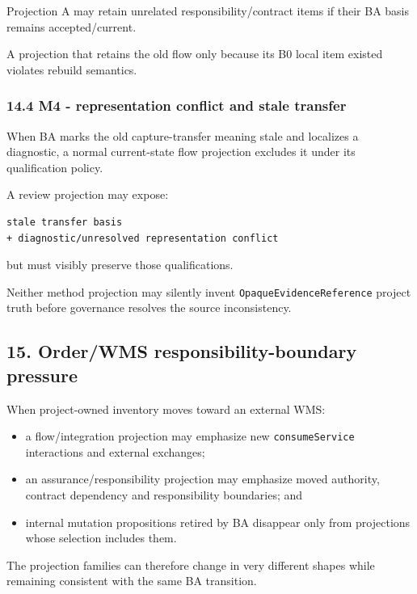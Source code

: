 \documentclass[11pt,a4paper]{article}
\providecommand{\tightlist}{\setlength{\itemsep}{0pt}\setlength{\parskip}{0pt}}
\begin{document}
Projection A may retain unrelated responsibility/contract items if their
BA basis remains accepted/current.

A projection that retains the old flow only because its B0 local item
existed violates rebuild semantics.

\subsubsection{14.4 M4 - representation conflict and stale
transfer}\label{144-m4---representation-conflict-and-stale-transfer}

When BA marks the old capture-transfer meaning stale and localizes a
diagnostic, a normal current-state flow projection excludes it under its
qualification policy.

A review projection may expose:

\begin{verbatim}
stale transfer basis
+ diagnostic/unresolved representation conflict
\end{verbatim}

but must visibly preserve those qualifications.

Neither method projection may silently invent
\texttt{OpaqueEvidenceReference} project truth before governance
resolves the source inconsistency.

\subsection{15. Order/WMS responsibility-boundary
pressure}\label{15-orderwms-responsibility-boundary-pressure}

When project-owned inventory moves toward an external WMS:

\begin{itemize}
\tightlist
\item
  a flow/integration projection may emphasize new
  \texttt{consumeService} interactions and external exchanges;
\item
  an assurance/responsibility projection may emphasize moved authority,
  contract dependency and responsibility boundaries; and
\item
  internal mutation propositions retired by BA disappear only from
  projections whose selection includes them.
\end{itemize}

The projection families can therefore change in very different shapes
while remaining consistent with the same BA transition.
\end{document}
